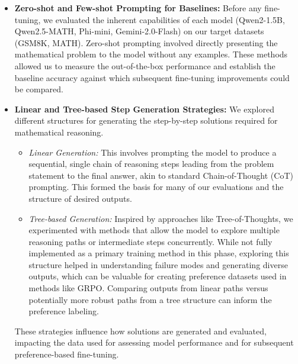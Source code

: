 \documentclass[11pt]{article}
\begin{document}
\begin{itemize}
    \item \textbf{Zero-shot and Few-shot Prompting for Baselines:}
    Before any fine-tuning, we evaluated the inherent capabilities of each model (Qwen2-1.5B, Qwen2.5-MATH, Phi-mini, Gemini-2.0-Flash) on our target datasets (GSM8K, MATH). Zero-shot prompting involved directly presenting the mathematical problem to the model without any examples. These methods allowed us to measure the out-of-the-box performance and establish the baseline accuracy against which subsequent fine-tuning improvements could be compared.

    \item \textbf{Linear and Tree-based Step Generation Strategies:}
    We explored different structures for generating the step-by-step solutions required for mathematical reasoning.
        \begin{itemize}
            \item \textit{Linear Generation:} This involves prompting the model to produce a sequential, single chain of reasoning steps leading from the problem statement to the final answer, akin to standard Chain-of-Thought (CoT) prompting. This formed the basis for many of our evaluations and the structure of desired outputs.
            \item \textit{Tree-based Generation:} Inspired by approaches like Tree-of-Thoughts, we experimented with methods that allow the model to explore multiple reasoning paths or intermediate steps concurrently. While not fully implemented as a primary training method in this phase, exploring this structure helped in understanding failure modes and generating diverse outputs, which can be valuable for creating preference datasets used in methods like GRPO. Comparing outputs from linear paths versus potentially more robust paths from a tree structure can inform the preference labeling.
        \end{itemize}
    These strategies influence how solutions are generated and evaluated, impacting the data used for assessing model performance and for subsequent preference-based fine-tuning.


\end{itemize}
\end{document}
